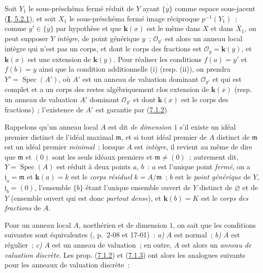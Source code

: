 Soit $Y_1$ le sous-préschéma fermé réduit de $Y$ ayant
$\overline{\{y\}}$ comme espace sous-jacent
(\hyperref[I.5.2.1-fr]{\textbf{I}, 5.2.1}), et soit $X_1$ le sous-préschéma fermé
image réciproque $p^{-1}(Y_1)$~; comme $y'\in\overline{\{y\}}$ par hypothèse
et que $\boldsymbol{k}(x)$ est le même dans $X$ et dans $X_1$, on peut supposer $Y$
\emph{intègre}, de point générique $y$~; $\mathcal{O}_{y'}$ est alors un
anneau local intègre qui n'est pas un corps, et dont le corps des fractions
est $\mathcal{O}_y=\boldsymbol{k}(y)$, et $\boldsymbol{k}(x)$ est une extension de $\boldsymbol{k}(y)$. Pour
réaliser les conditions $f(a)=y'$ et $f(b)=y$ ainsi que la condition
additionnelle (i) (resp. (ii)), on prendra
$Y'=\operatorname{Spec}(A')$, où $A'$ est un anneau de valuation dominant
$\mathcal{O}_{y'}$ et qui est complet et a un corps des restes
algébriquement clos extension de $\boldsymbol{k}(x)$ (resp. un anneau de valuation $A'$
dominant $\mathcal{O}_{y'}$ et dont $\boldsymbol{k}(x)$ est le corps des fractions)~;
l'existence de $A'$ est garantie par
(\hyperref[II.7.1.2-fr]{7.1.2}).

\begin{env}[7.1.5]
\label{II.7.1.5-fr}
Rappelons qu'un anneau local $A$ est dit \emph{de dimension $1$} s'il existe
un idéal premier distinct de l'idéal maximal $\mathfrak{m}$, et si tout idéal
premier de $A$ distinct de $\mathfrak{m}$ est un idéal premier
\emph{minimal}~; lorsque $A$ est \emph{intègre}, il revient au même de dire
que $\mathfrak{m}$ et $(0)$ sont les seuls idéaux premiers et
$\mathfrak{m}\neq(0)$~; autrement dit, $Y=\operatorname{Spec}(A)$ est
réduit à deux
points $a$, $b$~: $a$ est l'unique point \emph{fermé}, on a
$\mathfrak{j}_a=\mathfrak{m}$ et $\boldsymbol{k}(a)=k$ est le \emph{corps résiduel}
$k=A/\mathfrak{m}$~; $b$ est le \emph{point générique} de $Y$,
$\mathfrak{j}_b=(0)$, l'ensemble $\{b\}$ étant l'unique ensemble ouvert de
$Y$ distinct de $\varnothing$ et de $Y$ (ensemble ouvert qui est donc
\emph{partout dense}), et $\boldsymbol{k}(b)=K$ est le \emph{corps des fractions} de $A$.
\end{env}

\begin{env}[7.1.6]
\label{II.7.1.6-fr}
Pour un anneau local $A$, noethérien et de dimension $1$, on sait que les
conditions suivantes sont équivalentes
(\cite{I-1}, p.~2-08 et 17-01)~:
\textit{a)} $A$ est normal~;
\textit{b)} $A$ est régulier~;
\textit{c)} $A$ est un anneau de valuation~;
en outre, $A$ est alors un \emph{anneau de valuation discrète}. Les prop.
(\hyperref[II.7.1.2-fr]{7.1.2}) et
(\hyperref[II.7.1.3-fr]{7.1.3}) ont alors les analogues suivants pour les
anneaux de valuation discrète~:
\end{env}

